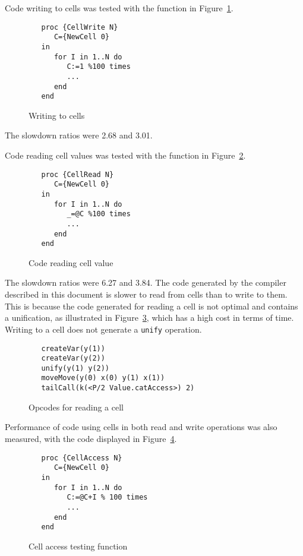 \documentclass[a4paper]{memoir}
\begin{document}
Code writing to cells was tested with the function in Figure~\ref{fig:perf:cellwrite}.

\begin{figure}[h]
\begin{lstlisting}
   proc {CellWrite N}
      C={NewCell 0}
   in
      for I in 1..N do
         C:=1 %100 times
         ...
      end
   end
\end{lstlisting}
\caption{Writing to cells}
\label{fig:perf:cellwrite}
\end{figure}

The slowdown ratios were 2.68 and 3.01.

Code reading cell values was tested with the function in Figure~\ref{fig:perf:cellread}.

\begin{figure}[h]
\begin{lstlisting}
   proc {CellRead N}
      C={NewCell 0}
   in
      for I in 1..N do
         _=@C %100 times
         ...
      end
   end
\end{lstlisting}
\caption{Code reading cell value}
\label{fig:perf:cellread}
\end{figure}

The slowdown ratios were 6.27 and 3.84.
The code generated by the compiler described in this document is slower to read from cells than to write to them.
This is because the code generated for reading a cell is not optimal and contains a unification,
as illustrated in Figure~\ref{fig:perf:cellreadunif}, which has a high cost in
terms of time. Writing to a cell does not generate a \lstinline!unify!
operation. 

\begin{figure}[h]
\begin{lstlisting}
   createVar(y(1))
   createVar(y(2))
   unify(y(1) y(2))
   moveMove(y(0) x(0) y(1) x(1))
   tailCall(k(<P/2 Value.catAccess>) 2)
\end{lstlisting}
\caption{Opcodes for reading a cell}
\label{fig:perf:cellreadunif}
\end{figure}



Performance of code using cells in both read and write operations was also measured, with the code displayed in
Figure~\ref{fig:perf:cells}.

\begin{figure}[h]
\begin{lstlisting}
   proc {CellAccess N}
      C={NewCell 0}
   in
      for I in 1..N do
         C:=@C+I % 100 times
         ...
      end
   end
\end{lstlisting}
\caption{Cell access testing function}
\label{fig:perf:cells}
\end{figure}
\end{document}
